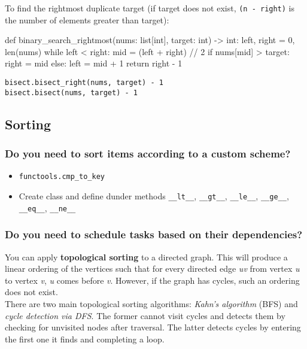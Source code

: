 \documentclass[12pt, titlepage]{article}
\begin{document}
To find the rightmost duplicate target (if target does not exist, \texttt{(n - right)} is the number of elements greater than target):
\begin{python}
def binary_search_rightmost(nums: list[int], target: int) -> int:
    left, right = 0, len(nums)
    while left < right:
        mid = (left + right) // 2
        if nums[mid] > target:
            right = mid
        else:
            left = mid + 1
    return right - 1
\end{python}
\texttt{bisect.bisect\_right(nums, target) - 1} \\
\texttt{bisect.bisect(nums, target) - 1}

\subsection{Sorting}

\subsubsection{Do you need to sort items according to a custom scheme?}
\begin{itemize}
  \item \texttt{functools.cmp\_to\_key} 
  \item Create class and define dunder methods \texttt{\_\_lt\_\_}, \texttt{\_\_gt\_\_}, \texttt{\_\_le\_\_}, \texttt{\_\_ge\_\_}, \texttt{\_\_eq\_\_}, \texttt{\_\_ne\_\_}
\end{itemize}
\bigskip

\subsubsection{Do you need to schedule tasks based on their dependencies?}

You can apply \textbf{topological sorting} to a directed graph. This will produce a linear ordering of the vertices such that for every directed edge \textit{uv} from vertex \textit{u} to vertex \textit{v}, \textit{u} comes before \textit{v}. However, if the graph has cycles, such an ordering does not exist.\medskip\\

There are two main topological sorting algorithms: \textit{Kahn's algorithm} (BFS) and \textit{cycle detection via DFS}. The former cannot visit cycles and detects them by checking for unvisited nodes after traversal. The latter detects cycles by entering the first one it finds and completing a loop.\\
\end{document}
